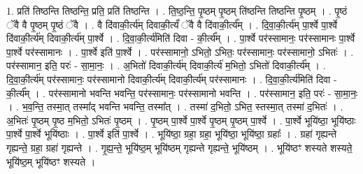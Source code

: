 \documentclass[17pt]{extarticle}
\begin{document}
1. प्रति॑ तिष्ठन्ति तिष्ठन्ति॒ प्रति॒ प्रति॑ तिष्ठन्ति । . ति॒ष्ठ॒न्ति॒ पृ॒ष्ठम् पृ॒ष्ठम् ति॑ष्ठन्ति तिष्ठन्ति पृ॒ष्ठम् । . पृ॒ष्ठं ॅवै वै पृ॒ष्ठम् पृ॒ष्ठं ॅवै । . वै दि॑वाकी॒र्त्य॑म् दिवाकी॒र्त्यं॑ ॅवै वै दि॑वाकी॒र्त्य᳚म् । . दि॒वा॒की॒र्त्य॑म् पा॒र्श्वे पा॒र्श्वे दि॑वाकी॒र्त्य॑म् दिवाकी॒र्त्य॑म् पा॒र्श्वे । . दि॒वा॒की॒र्त्य॑मिति॑ दिवा - की॒र्त्य᳚म् । . पा॒र्श्वे पर॑स्सामानः॒ पर॑स्सामानः पा॒र्श्वे पा॒र्श्वे पर॑स्सामानः । . पा॒र्श्वे इति॑ पा॒र्श्वे । . पर॑स्सामानो॒ ऽभितो॒ ऽभितः॒ पर॑स्सामानः॒ पर॑स्सामानो॒ ऽभितः॑ । . पर॑स्सामान॒ इति॒ परः॑ - सा॒मा॒नः॒ । . अ॒भितो॑ दिवाकी॒र्त्य॑म् दिवाकी॒र्त्य॑ म॒भितो॒ ऽभितो॑ दिवाकी॒र्त्य᳚म् । . दि॒वा॒की॒र्त्य॑म् पर॑स्सामानः॒ पर॑स्सामानो दिवाकी॒र्त्य॑म् दिवाकी॒र्त्य॑म् पर॑स्सामानः । . दि॒वा॒की॒र्त्य॑मिति॑ दिवा - की॒र्त्य᳚म् । . पर॑स्सामानो भवन्ति भवन्ति॒ पर॑स्सामानः॒ पर॑स्सामानो भवन्ति । . पर॑स्सामान॒ इति॒ परः॑ - सा॒मा॒नः॒ । . भ॒व॒न्ति॒ तस्मा॒त् तस्मा᳚द् भवन्ति भवन्ति॒ तस्मा᳚त् । . तस्मा॑ द॒भितो॒ ऽभित॒ स्तस्मा॒त् तस्मा॑ द॒भितः॑ । . अ॒भितः॑ पृ॒ष्ठम् पृ॒ष्ठ म॒भितो॒ ऽभितः॑ पृ॒ष्ठम् । . पृ॒ष्ठम् पा॒र्श्वे पा॒र्श्वे पृ॒ष्ठम् पृ॒ष्ठम् पा॒र्श्वे । . पा॒र्श्वे भूयि॑ष्ठा॒ भूयि॑ष्ठाः पा॒र्श्वे पा॒र्श्वे भूयि॑ष्ठाः । . पा॒र्श्वे इति॑ पा॒र्श्वे । . भूयि॑ष्ठा॒ ग्रहा॒ ग्रहा॒ भूयि॑ष्ठा॒ भूयि॑ष्ठा॒ ग्रहाः᳚ । . ग्रहा॑ गृह्यन्ते गृह्यन्ते॒ ग्रहा॒ ग्रहा॑ गृह्यन्ते । . गृ॒ह्य॒न्ते॒ भूयि॑ष्ठ॒म् भूयि॑ष्ठम् गृह्यन्ते गृह्यन्ते॒ भूयि॑ष्ठम् । . भूयि॑ष्ठꣳ शस्यते शस्यते॒ भूयि॑ष्ठ॒म् भूयि॑ष्ठꣳ शस्यते । \newline
\end{document}

